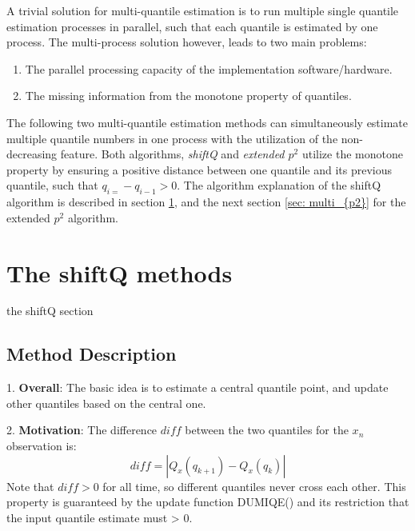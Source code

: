 A trivial solution for multi-quantile estimation is to run multiple single quantile estimation processes in parallel, such that each quantile is estimated by one process. The multi-process solution however, leads to two main problems:
\begin{enumerate}
    \item The parallel processing capacity of the implementation software/hardware.
    \item The missing information from the monotone property of quantiles.
\end{enumerate}

The following two multi-quantile estimation methods can simultaneously estimate multiple quantile numbers in one process with the utilization of the non-decreasing feature. Both algorithms, \textit{shiftQ}\cite{hammerJointTrackingMultiple2019b} and \textit{extended $p^2$}\cite{raatikainenSequentialProcedureSimultaneous1993} utilize the monotone property by ensuring a positive distance between one quantile and its previous quantile, such that 
$q_{i=} - q_{i-1} > 0$. The algorithm explanation of the shiftQ algorithm is described in section \ref{sec: multi_shiftQ}, and the next section \ref{sec: multi_{p2}} for the extended $p^2$ algorithm.


\section{The shiftQ methods}
\label{sec: multi_shiftQ}
the shiftQ section

\subsection{Method Description}

1. \textbf{Overall}: The basic idea is to estimate a central quantile point, and update other quantiles based on the central one. 

2. \textbf{Motivation}: The difference $diff$ between the two quantiles for the $x_{n}$ observation is:
$$
diff = |Q_x(q_{k+1}) - Q_x(q_k)|
$$
    Note that $diff > 0$ for all time, so different quantiles never cross each other. This property is guaranteed by the update function DUMIQE() and its restriction that the input quantile estimate must > 0.


